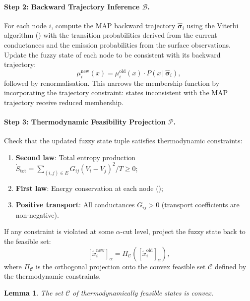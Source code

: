 \documentclass[twocolumn,10pt,a4paper]{article}
\newtheorem{lemma}[theorem]{Lemma}
\theoremstyle{definition}
\theoremstyle{remark}
\newcommand{\Pcal}{\mathcal{P}}
\newcommand{\vect}[1]{\boldsymbol{#1}}
\newcommand{\fuzzy}[1]{\widetilde{#1}}
\begin{document}
\paragraph{Step 2: Backward Trajectory Inference $\mathcal{B}$.}

For each node $i$, compute the MAP backward trajectory $\hat{\vect{\sigma}}_i$ using the Viterbi algorithm () with the transition probabilities derived from the current conductances and the emission probabilities from the surface observations. Update the fuzzy state of each node to be consistent with its backward trajectory:
\begin{equation}\label{eq:backward_step}
\mu_i^{\mathrm{new}}(x) = \mu_i^{\mathrm{old}}(x) \cdot P(x \,|\, \hat{\vect{\sigma}}_i),
\end{equation}
followed by renormalisation. This narrows the membership function by incorporating the trajectory constraint: states inconsistent with the MAP trajectory receive reduced membership.

\paragraph{Step 3: Thermodynamic Feasibility Projection $\Pcal$.}

Check that the updated fuzzy state tuple satisfies thermodynamic constraints:
\begin{enumerate}[label=(\alph*)]
\item \textbf{Second law}: Total entropy production $\dot{S}_{\mathrm{tot}} = \sum_{(i,j) \in E} G_{ij}(V_i - V_j)^2 / T \geq 0$;
\item \textbf{First law}: Energy conservation at each node ();
\item \textbf{Positive transport}: All conductances $G_{ij} > 0$ (transport coefficients are non-negative).
\end{enumerate}

If any constraint is violated at some $\alpha$-cut level, project the fuzzy state back to the feasible set:
\begin{equation}\label{eq:projection_step}
[\fuzzy{x}_i^{\mathrm{new}}]_\alpha = \Pi_{\mathcal{C}} \left([\fuzzy{x}_i^{\mathrm{old}}]_\alpha\right),
\end{equation}
where $\Pi_{\mathcal{C}}$ is the orthogonal projection onto the convex feasible set $\mathcal{C}$ defined by the thermodynamic constraints.

\begin{lemma}\label{lem:feasible_convex}
The set $\mathcal{C}$ of thermodynamically feasible states is convex.
\end{lemma}
\end{document}
